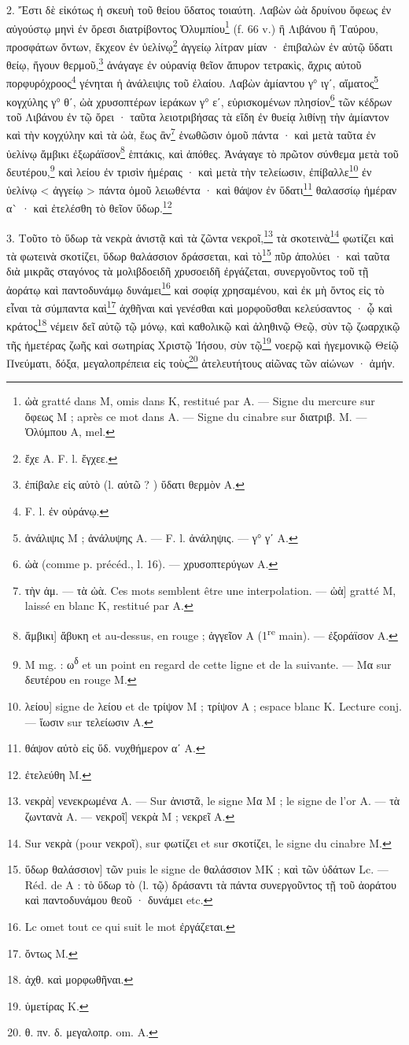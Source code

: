 \documentclass[a4paper, 11pt, oneside, polutonikogreek, french]{article}
\begin{document}
2. Ἔστι δὲ εἰκότως ἡ σκευὴ τοῦ θείου ὕδατος τοιαύτη. Λαβὼν ὠὰ δρυίνου ὄφεως ἐν αὐγούστῳ μηνὶ ἐν ὄρεσι διατρίβοντος Ὀλυμπίου\footnote{ὠὰ gratté dans M, omis dans K, restitué par A. --- Signe du mercure sur ὄφεως M ; après ce mot dans A. --- Signe du cinabre sur διατριβ. M. --- Ὀλύμπου A, mel.} (f. 66 v.) ἢ Λιβάνου ἢ Ταύρου, προσφάτων ὄντων, ἔκχεον ἐν ὑελίνῳ\footnote{ἔχε A. F. l. ἔγχεε.} ἀγγείῳ λίτραν μίαν · ἐπιβαλὼν ἐν αὐτῷ ὕδατι θείῳ, ἤγουν θερμοῦ,\footnote{ἐπίβαλε εἰς αὐτὸ (l. αὐτῶ ? ) ὕδατι θερμὸν A.} ἀνάγαγε ἐν οὐρανίᾳ θεῖον ἄπυρον τετρακὶς, ἄχρις αὐτοῦ πορφυρόχροος\footnote{F. l. ἐν οὐράνῳ.} γένηται ἡ ἀνάλειψις τοῦ ἐλαίου. Λαβὼν ἀμίαντου γ° ιγʹ, αἵματος\footnote{ἀνάλιψις M ; ἀνάλυψης A. --- F. l. ἀνάληψις. --- γ° γʹ A.} κογχύλης γ° θʹ, ὠὰ χρυσοπτέρων ἱεράκων γ° εʹ, εὑρισκομένων πλησίον\footnote{ὠὰ (comme p. précéd., l. 16). --- χρυσοπτερύγων A.} τῶν κέδρων τοῦ Λιβάνου ἐν τῷ ὄρει · ταῦτα λειοτριβήσας τὰ εἴδη ἐν θυείᾳ λιθίνῃ τὴν ἀμίαντον καὶ τὴν κογχύλην καὶ τὰ ὠὰ, ἕως ἂν\footnote{τὴν ἀμ. --- τὰ ὠὰ. Ces mots semblent être une interpolation. --- ὠὰ] gratté M, laissé en blanc K, restitué par A.} ἑνωθῶσιν ὁμοῦ πάντα · καὶ μετὰ ταῦτα ἐν ὑελίνῳ ἄμβικι ἐξωράϊσον\footnote{ἄμβικι] ἄβυκη et au-dessus, en rouge ; ἀγγεῖον A (1\textsuperscript{re} main). --- ἐξοράϊσον A.} ἑπτάκις, καὶ ἀπόθες. Ἀνάγαγε τὸ πρῶτον σύνθεμα μετὰ τοῦ δευτέρου,\footnote{M mg. : ω\textsuperscript{δ} et un point en regard de cette ligne et de la suivante. --- Mα sur δευτέρου en rouge M.} καὶ λείου ἐν τρισὶν ἡμέραις · καὶ μετὰ τὴν τελείωσιν, ἐπίβαλλε\footnote{λείου] signe de λείου et de τρίψον M ; τρίψον A ; espace blanc K. Lecture conj. --- ἴωσιν sur τελείωσιν A.} ἐν ὑελίνῳ < ἀγγείῳ > πάντα ὁμοῦ λειωθέντα · καὶ θάψον ἐν ὕδατι\footnote{θάψον αὐτὸ εἰς ὕδ. νυχθήμερον αʹ A.} θαλασσίῳ ἡμέραν α` · καὶ ἐτελέσθη τὸ θεῖον ὕδωρ.\footnote{ἐτελεύθη M.}

3. Τοῦτο τὸ ὕδωρ τὰ νεκρὰ ἀνιστᾷ καὶ τὰ ζῶντα νεκροῖ,\footnote{νεκρὰ] νενεκρωμένα A. --- Sur ἀνιστᾶ, le signe Mα M ; le signe de l'or A. --- τὰ ζωντανὰ A. --- νεκροῖ] νεκρὰ M ; νεκρεῖ A.} τὰ σκοτεινὰ\footnote{Sur νεκρὰ (pour νεκροῖ), sur φωτίζει et sur σκοτίζει, le signe du cinabre M.} φωτίζει καὶ τὰ φωτεινὰ σκοτίζει, ὕδωρ θαλάσσιον δράσσεται, καὶ τὸ\footnote{ὕδωρ θαλάσσιον] τῶν puis le signe de θαλάσσιον MK ; καὶ τῶν ὑδάτων Lc. --- Réd. de A : τὸ ὕδωρ τὸ (l. τῷ) δράσαντι τὰ πάντα συνεργοῦντος τῇ τοῦ ἀοράτου καὶ παντοδυνάμου θεοῦ · δυνάμει etc.} πῦρ ἀπολύει · καὶ ταῦτα διὰ μικρᾶς σταγόνος τὰ μολιβδοειδῆ χρυσοειδῆ ἐργάζεται, συνεργοῦντος τοῦ τῇ ἀοράτῳ καὶ παντοδυνάμῳ δυνάμει\footnote{Lc omet tout ce qui suit le mot ἐργάζεται.} καὶ σοφίᾳ χρησαμένου, καὶ ἐκ μὴ ὄντος εἰς τὸ εἶναι τὰ σύμπαντα καὶ\footnote{ὄντως M.} ἀχθῆναι καὶ γενέσθαι καὶ μορφοῦσθαι κελεύσαντος · ᾧ καὶ κράτος\footnote{ἀχθ. καὶ μορφωθῆναι.} νέμειν δεῖ αὐτῷ τῷ μόνῳ, καὶ καθολικῷ καὶ ἀληθινῷ Θεῷ, σὺν τῷ ζωαρχικῷ τῆς ἡμετέρας ζωῆς καὶ σωτηρίας Χριστῷ Ἰήσου, σὺν τῷ\footnote{ὑμετίρας K.} νοερῷ καὶ ἡγεμονικῷ Θείῷ Πνεύματι, δόξα, μεγαλοπρέπεια εἰς τοὺς\footnote{θ. πν. δ. μεγαλοπρ. om. A.} ἀτελευτήτους αἰῶνας τῶν αἰώνων · ἀμήν.
\end{document}
